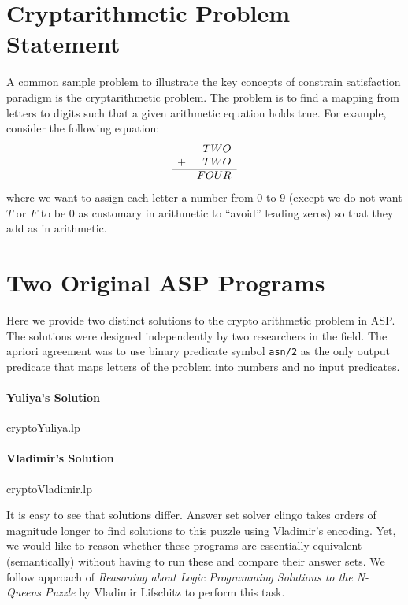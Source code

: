\documentclass{article}
\begin{document}
\newpage


\section{Cryptarithmetic Problem Statement}
A common sample problem to illustrate the key concepts of constrain satisfaction paradigm is the cryptarithmetic problem. The problem is to find a mapping from letters to digits such that a given arithmetic equation holds true. For example, consider the following equation:
\begin{equation}
    \begin{array}{lr}
 &TWO\\
 +&TWO\\
 \hline
 &FOUR
\end{array}
\end{equation}
where we want to assign each letter a number from $0$ to $9$ (except we do not want $T$ or $F$ to be $0$ as customary in arithmetic to ``avoid'' leading zeros) so that they add as in arithmetic. 


    \section{Two Original ASP Programs}
    Here we provide two distinct solutions to the crypto arithmetic problem in ASP. The solutions were designed independently by two researchers in the field. The apriori agreement was to use binary predicate symbol {\tt asn/2} as the only output predicate that maps letters of the problem into numbers and no input predicates. 

    \paragraph{Yuliya's Solution}
    
{cryptoYuliya.lp}

    \paragraph{Vladimir's Solution}
    
{cryptoVladimir.lp}

It is easy to see that solutions differ. Answer set solver {\sc clingo} takes orders of magnitude longer to find solutions to this puzzle using Vladimir's encoding.
Yet, we would like to reason whether these programs are essentially equivalent (semantically) without having to run these and compare their answer sets. We follow approach of {\em Reasoning about Logic Programming Solutions
to the N-Queens Puzzle} by Vladimir Lifschitz to perform this task.
\end{document}
